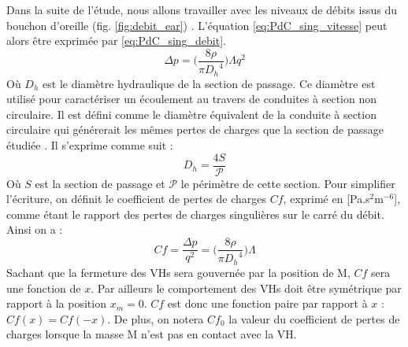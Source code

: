 Dans la suite de l'étude, nous allons travailler avec les niveaux de débits issus du bouchon d'oreille (fig.  \ref{fig:debit_ear}) \cite{Delnavaz2012}. L'équation \ref{eq:PdC_sing_vitesse} peut alors être exprimée par \ref{eq:PdC_sing_debit}.
\begin{equation}
\Delta p =  \biggl(\frac{8\rho}{\pi {D_h}^4}\biggr)\Lambda q^2
\label{eq:PdC_sing_debit}
\end{equation}
Où $D_h$ est le diamètre hydraulique de la section de passage. Ce diamètre est utilisé pour caractériser un écoulement au travers de conduites à section non circulaire. Il est défini comme le diamètre équivalent de la conduite à section circulaire qui générerait les mêmes pertes de charges que la section de passage étudiée \cite{Brater1988}. Il s'exprime comme suit :
\begin{equation}
D_h = \frac{4S}{\mathcal{P}}
\label{eq:Dh_definition}
\end{equation}
Où $S$ est la section de passage et $\mathcal{P}$ le périmètre de cette section. Pour simplifier l'écriture, on définit le coefficient de pertes de charges $Cf$, exprimé en [Pa.s$^2$m$^{-6}$], comme étant le rapport des pertes de charges singulières sur le carré du débit. Ainsi on a :
\begin{equation}
Cf = \frac{\Delta p}{q^2} = \biggl(\frac{8\rho}{\pi {D_h}^4}\biggr)\Lambda
\label{eq:Cf_definition}
\end{equation}
Sachant que la fermeture des VHs sera gouvernée par la position de M, $Cf$ sera une fonction de $x$. Par ailleurs le comportement des VHs doit être symétrique par rapport à la position $x_m=0$. $Cf$ est donc une fonction paire par rapport à $x$ : $Cf(x) = Cf(-x)$. De plus, on notera $Cf_0$ la valeur du coefficient de pertes de charges lorsque la masse M n'est pas en contact avec la VH.
